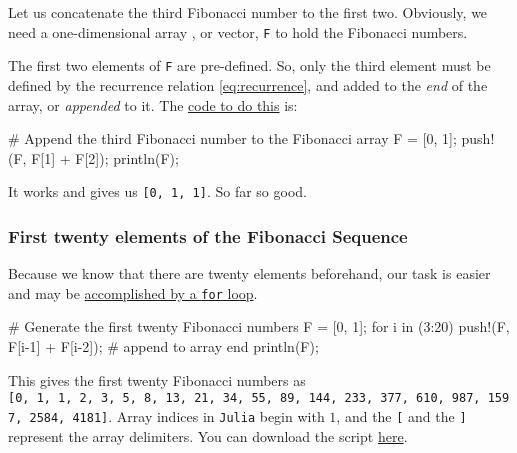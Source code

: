\documentclass[
  a4paper,
]{article}
\newenvironment{Shaded}{\begin{snugshade}}{\end{snugshade}}
\newcommand{\CommentTok}[1]{\textcolor[rgb]{0.50,0.62,0.50}{#1}}
\newcommand{\ControlFlowTok}[1]{\textcolor[rgb]{0.94,0.87,0.69}{#1}}
\newcommand{\FloatTok}[1]{\textcolor[rgb]{0.75,0.75,0.82}{#1}}
\newcommand{\FunctionTok}[1]{\textcolor[rgb]{0.94,0.94,0.56}{#1}}
\newcommand{\KeywordTok}[1]{\textcolor[rgb]{0.94,0.87,0.69}{#1}}
\newcommand{\NormalTok}[1]{\textcolor[rgb]{0.80,0.80,0.80}{#1}}
\newcommand{\OperatorTok}[1]{\textcolor[rgb]{0.94,0.94,0.82}{#1}}
\begin{document}
Let us concatenate the third Fibonacci number to the first two.
Obviously, we need a one-dimensional array , or vector, \texttt{F} to
hold the Fibonacci numbers.

The first two elements of \texttt{F} are pre-defined. So, only the third
element must be defined by the recurrence relation \cref{eq:recurrence},
and added to the \emph{end} of the array, or \emph{appended} to it. The
\href{first-three.jl}{code to do this} is:

\begin{Shaded}
\begin{Highlighting}[]
\CommentTok{\# Append the third Fibonacci number to the Fibonacci array}
\NormalTok{F }\OperatorTok{=}\NormalTok{ [}\FloatTok{0}\NormalTok{, }\FloatTok{1}\NormalTok{];}
\FunctionTok{push!}\NormalTok{(F, F[}\FloatTok{1}\NormalTok{] }\OperatorTok{+}\NormalTok{ F[}\FloatTok{2}\NormalTok{]);}
\FunctionTok{println}\NormalTok{(F);}
\end{Highlighting}
\end{Shaded}

It works and gives us \texttt{{[}0,\ 1,\ 1{]}}. So far so good.

\hypertarget{first-twenty-elements-of-the-fibonacci-sequence}{%
\subsubsection{First twenty elements of the Fibonacci
Sequence}\label{first-twenty-elements-of-the-fibonacci-sequence}}

Because we know that there are twenty elements beforehand, our task is
easier and may be \href{auxiliary/first-twenty.jl}{accomplished by a
\texttt{for} loop}.

\begin{Shaded}
\begin{Highlighting}[]
\CommentTok{\# Generate the first twenty Fibonacci numbers}
\NormalTok{F }\OperatorTok{=}\NormalTok{ [}\FloatTok{0}\NormalTok{, }\FloatTok{1}\NormalTok{];}
\ControlFlowTok{for}\NormalTok{ i }\KeywordTok{in}\NormalTok{ (}\FloatTok{3}\OperatorTok{:}\FloatTok{20}\NormalTok{)}
  \FunctionTok{push!}\NormalTok{(F, F[i}\OperatorTok{{-}}\FloatTok{1}\NormalTok{] }\OperatorTok{+}\NormalTok{ F[i}\OperatorTok{{-}}\FloatTok{2}\NormalTok{]); }\CommentTok{\# append to array}
\ControlFlowTok{end}
\FunctionTok{println}\NormalTok{(F);}
\end{Highlighting}
\end{Shaded}

This gives the first twenty Fibonacci numbers as
\texttt{{[}0,\ 1,\ 1,\ 2,\ 3,\ 5,\ 8,\ 13,\ 21,\ 34,\ 55,\ 89,\ 144,\ 233,\ 377,\ 610,\ 987,\ 1597,\ 2584,\ 4181{]}}.
Array indices in \texttt{Julia} begin with \(1\), and the \texttt{{[}}
and the \texttt{{]}} represent the array delimiters. You can download
the script \href{auxiliary/\%7Dfirst-twenty.jl}{here}.
\end{document}

